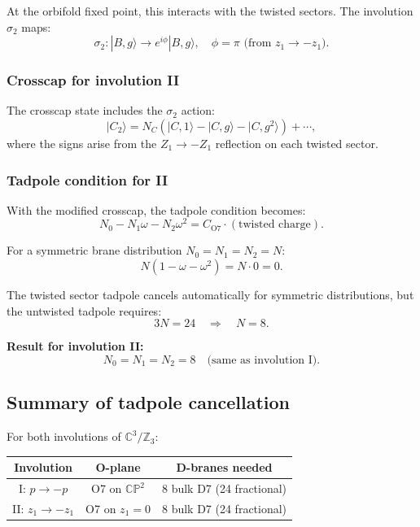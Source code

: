 \documentclass[11pt]{article}
\newcommand{\Z}{\mathbb{Z}}
\newcommand{\C}{\mathbb{C}}
\newcommand{\CP}{\mathbb{CP}}
\begin{document}
At the orbifold fixed point, this interacts with the twisted sectors. The involution $\sigma_2$ maps:
\begin{equation}
\sigma_2: |B, g\rangle \to e^{i\phi} |B, g\rangle, \quad \phi = \pi \text{ (from } z_1 \to -z_1\text{)}.
\end{equation}

\subsubsection{Crosscap for involution II}

The crosscap state includes the $\sigma_2$ action:
\begin{equation}
|C_2\rangle = N_C \left( |C, 1\rangle - |C, g\rangle - |C, g^2\rangle \right) + \cdots,
\end{equation}
where the signs arise from the $Z_1 \to -Z_1$ reflection on each twisted sector.

\subsubsection{Tadpole condition for II}

With the modified crosscap, the tadpole condition becomes:
\begin{equation}
N_0 - N_1 \omega - N_2 \omega^2 = C_{\text{O7}} \cdot (\text{twisted charge}).
\end{equation}

For a symmetric brane distribution $N_0 = N_1 = N_2 = N$:
\begin{equation}
N(1 - \omega - \omega^2) = N \cdot 0 = 0.
\end{equation}

The twisted sector tadpole cancels automatically for symmetric distributions, but the untwisted tadpole requires:
\begin{equation}
3N = 24 \quad \Rightarrow \quad N = 8.
\end{equation}

\textbf{Result for involution II:}
\begin{equation}\boxed{
N_0 = N_1 = N_2 = 8 \quad \text{(same as involution I)}.
}
\end{equation}

\subsection{Summary of tadpole cancellation}

For both involutions of $\C^3/\Z_3$:
\begin{center}
\begin{tabular}{|c|c|c|}
\hline
Involution & O-plane & D-branes needed \\
\hline
I: $p \to -p$ & O7 on $\CP^2$ & 8 bulk D7 (24 fractional) \\
II: $z_1 \to -z_1$ & O7 on $z_1 = 0$ & 8 bulk D7 (24 fractional) \\
\hline
\end{tabular}
\end{center}
\end{document}
